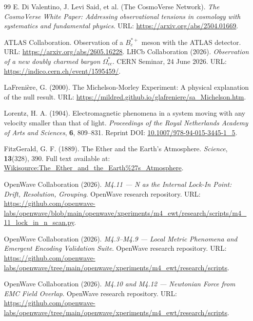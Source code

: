 \documentclass[10pt,a4paper]{article}
\begin{document}
\begin{thebibliography}{99}
	E. Di Valentino, J. Levi Said, et al. (The CosmoVerse Network).
	\textit{The CosmoVerse White Paper: Addressing observational tensions in cosmology with systematics and fundamental physics}.
		URL: \href{https://arxiv.org/abs/2504.01669}{https://arxiv.org/abs/2504.01669}.

	
	ATLAS Collaboration.
	Observation of a \(B_c^{*+}\) meson with the ATLAS detector.
			URL: \href{https://arxiv.org/abs/2605.16228}{https://arxiv.org/abs/2605.16228}.
	LHCb Collaboration (2026).
	\textit{Observation of a new doubly charmed baryon \(\Omega_{cc}^*\)}.
	CERN Seminar, 24 June 2026.
	URL: \href{https://indico.cern.ch/event/1595459/}{https://indico.cern.ch/event/1595459/}.
	
	LaFrenière, G. (2000).
	The Michelson-Morley Experiment: A physical explanation of the null result.
	URL: \href{https://mildred.github.io/glafreniere/sa_Michelson.htm}{https://mildred.github.io/glafreniere/sa\_Michelson.htm}.
		
	Lorentz, H. A. (1904).
	Electromagnetic phenomena in a system moving with any velocity smaller than that of light.
	\textit{Proceedings of the Royal Netherlands Academy of Arts and Sciences}, \textbf{6}, 809--831.
	Reprint DOI: \href{https://doi.org/10.1007/978-94-015-3445-1_5}{10.1007/978-94-015-3445-1\_5}.
	
	FitzGerald, G. F. (1889). 
	The Ether and the Earth's Atmosphere. 
	\textit{Science}, \textbf{13}(328), 390. 
	Full text available at: \href{https://en.wikisource.org/wiki/The_Ether_and_the_Earth%27s_Atmosphere}{Wikisource:The\_Ether\_and\_the\_Earth\%27s\_Atmosphere}.
	
	OpenWave Collaboration (2026).
	\textit{M4.11 --- N as the Internal Lock-In Point: Drift, Resolution, Grouping}.
	OpenWave research repository.
	URL: \url{https://github.com/openwave-labs/openwave/blob/main/openwave/xperiments/m4_ewt/research/scripts/m4_11_lock_in_n_scan.py}.
	
	OpenWave Collaboration (2026).
	\textit{M4.3--M4.9 --- Local Metric Phenomena and Emergent Encoding Validation Suite}.
	OpenWave research repository.
	URL: \url{https://github.com/openwave-labs/openwave/tree/main/openwave/xperiments/m4_ewt/research/scripts}.
	
	OpenWave Collaboration (2026).
	\textit{M4.10 and M4.12 --- Newtonian Force from EMC Field Overlap}.
	OpenWave research repository.
	URL: \url{https://github.com/openwave-labs/openwave/tree/main/openwave/xperiments/m4_ewt/research/scripts}.
	

\end{thebibliography}
\end{document}
